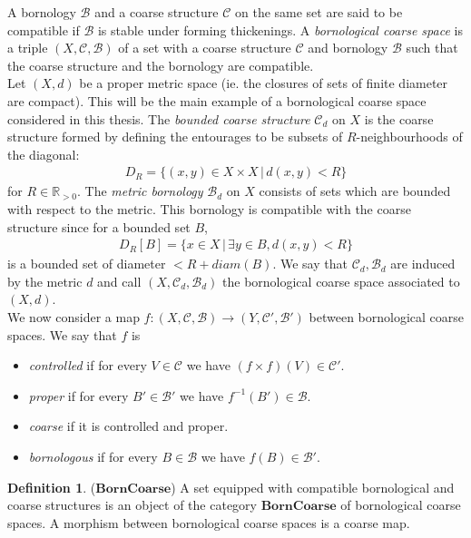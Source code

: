 \documentclass[a4paper,11pt]{article}
\theoremstyle{definition}
\newtheorem{definition}{Definition}[section]
\theoremstyle{plain}
\theoremstyle{remark}
\begin{document}
 A bornology $\mathcal{B}$ and a coarse structure $\mathcal{C}$ on the same set are said to be compatible if $\mathcal{B}$ is stable under forming thickenings. A \textit{bornological coarse space} is a triple $(X,\mathcal{C},\mathcal{B})$ of a set with a coarse structure $\mathcal{C}$ and bornology $\mathcal{B}$ such that the coarse structure and the bornology are compatible.\\


Let $(X,d)$ be a proper metric space (ie. the closures of sets of finite diameter are compact). This will be the main example of a bornological coarse space considered in this thesis. The \textit{bounded coarse structure} $\mathcal{C}_{d}$ on $X$ is the coarse structure formed by defining the entourages to be subsets of $R$-neighbourhoods of the diagonal:
\begin{align*}
D_{R}= \{(x,y)\in X\times X \,|\, d(x,y)<R\}
\end{align*}
for $R\in \mathbb{R}_{> 0}$. The \textit{metric bornology} $\mathcal{B}_{d}$ on $X$ consists of sets which are bounded with respect to the metric. This bornology is compatible with the coarse structure since for a bounded set $B$, 
\begin{align*}
D_{R}[B] = \{x\in X\,|\, \exists y\in B, d(x,y) <R\}
\end{align*}
is a bounded set of diameter $< R+diam(B)$. We say that $\mathcal{C}_{d},\mathcal{B}_{d}$ are induced by the metric $d$ and call $(X,\mathcal{C}_{d}, \mathcal{B}_{d})$ the bornological coarse space associated to $(X,d)$. \\

We now consider a map $f:(X, \mathcal{C},\mathcal{B})\rightarrow (Y, \mathcal{C}',\mathcal{B}')$ between bornological coarse spaces.  We say that $f$ is

\begin{itemize}
\item  \textit{controlled} if for every $V\in \mathcal{C}$ we have $(f\times f)(V)\in \mathcal{C}'$. 
\item \textit{proper} if for every $B'\in \mathcal{B}'$ we have $f^{-1}(B') \in \mathcal{B}$. \item \textit{coarse} if it is controlled and proper. 
\item  \textit{bornologous} if for every $B\in \mathcal{B}$ we have $f(B)\in \mathcal{B}'$. 
\end{itemize}


\begin{definition} ($\mathbf{BornCoarse}$) A set equipped with compatible bornological and coarse structures is an object of the category $\mathbf{BornCoarse}$ of bornological coarse spaces. A morphism between bornological coarse spaces is a coarse map. 
\end{definition}
\end{document}
